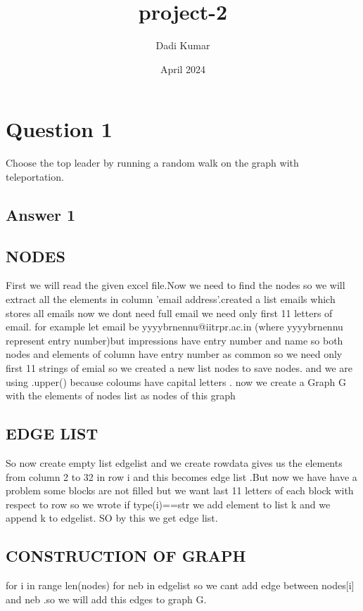 \documentclass{article}
\title{project-2}
\author{Dadi Kumar}
\date{April 2024}
\begin{document}
\maketitle

\section{Question 1}
Choose the top leader by running a random walk on the graph with teleportation. 
\subsection{Answer 1}
\subsection{NODES}
First we will read the given excel file.Now we need to find the nodes so we will extract all the elements in column 'email address'.created a list emails which stores all emails now we dont need full email we need only first 11 letters of email. for example let email be 
yyyybrnennu@iitrpr.ac.in (where yyyybrnennu represent entry number)but  impressions have entry number and name so both nodes and elements of column have entry number as common so we need only first 11 strings of emial so we created a new list nodes to save nodes.  and we are using .upper() because coloums have capital letters . now we create a Graph G with the elements of nodes list as nodes of this graph
\subsection{EDGE LIST}
So now create empty list edgelist and we create rowdata gives us the elements from column 2 to 32 in row i  and this becomes edge list .But now we have have a problem some blocks are not filled but we want last 11 letters of each block with respect to row so we wrote if type(i)==str we add element to list k and we append k to edgelist. SO by this we get edge list.
\subsection{CONSTRUCTION OF GRAPH}
for i in range len(nodes) for neb in edgelist so we cant add edge between nodes[i] and neb .so we will add this edges to graph G.
\newpage
\end{document}
